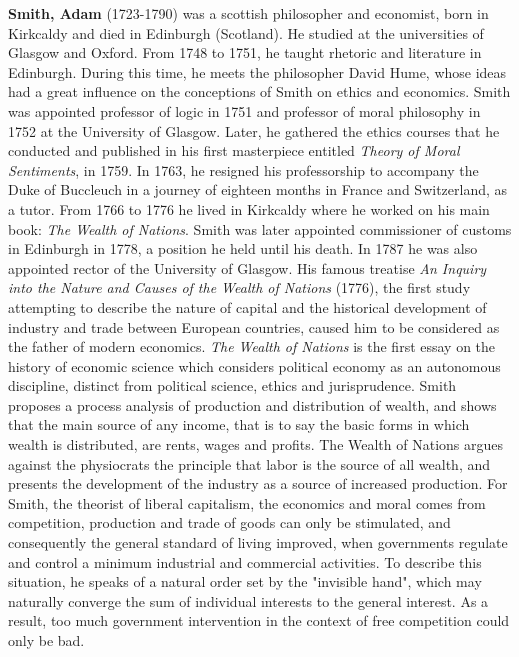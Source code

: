 \textbf{Smith, Adam} (1723-1790) was a scottish philosopher and economist, born in Kirkcaldy and died in Edinburgh (Scotland). He studied at the universities of Glasgow and Oxford. From 1748 to 1751, he taught rhetoric and literature in Edinburgh. During this time, he meets the philosopher David Hume, whose ideas had a great influence on the conceptions of Smith on ethics and economics. Smith was appointed professor of logic in 1751 and professor of moral philosophy in 1752 at the University of Glasgow. Later, he gathered the ethics courses that he conducted and published in his first masterpiece entitled \textit{Theory of Moral Sentiments}, in 1759. In 1763, he resigned his professorship to accompany the Duke of Buccleuch in a journey of eighteen months in France and Switzerland, as a tutor. From 1766 to 1776 he lived in Kirkcaldy where he worked on his main book: \textit{The Wealth of Nations}. Smith was later appointed commissioner of customs in Edinburgh in 1778, a position he held until his death. In 1787 he was also appointed rector of the University of Glasgow. His famous treatise\textit{ An Inquiry into the Nature and Causes of the Wealth of Nations} (1776), the first study attempting to describe the nature of capital and the historical development of industry and trade between European countries, caused him to be considered as the father of modern economics. \textit{The Wealth of Nations} is the first essay on the history of economic science which considers political economy as an autonomous discipline, distinct from political science, ethics and jurisprudence. Smith proposes a process analysis of production and distribution of wealth, and shows that the main source of any income, that is to say the basic forms in which wealth is distributed, are rents, wages and profits. The Wealth of Nations argues against the physiocrats the principle that labor is the source of all wealth, and presents the development of the industry as a source of increased production. For Smith, the theorist of liberal capitalism, the economics and moral comes from competition, production and trade of goods can only be stimulated, and consequently the general standard of living improved, when governments regulate and control a minimum industrial and commercial activities. To describe this situation, he speaks of a natural order set by the "invisible hand", which may naturally converge the sum of individual interests to the general interest. As a result, too much government intervention in the context of free competition could only be bad.

